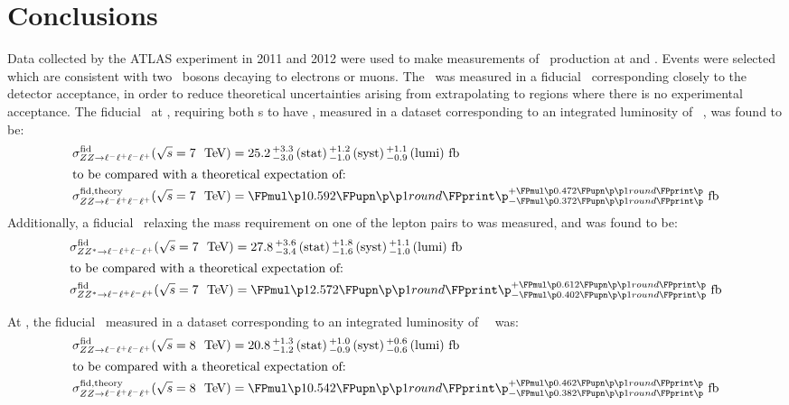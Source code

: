 \graphicspath{{Chapters/Conclusions/Figures/}}
\chapter{Conclusions}
\label{chap:Conclusions}
Data collected by the ATLAS experiment in 2011 and 2012 were used to make
measurements of \ZZ\ production at  and .
Events were selected which are consistent with two \Z\ bosons decaying to
electrons or muons. The \cx\ was measured in a fiducial \phasespace\
corresponding closely to the detector acceptance, in order to reduce theoretical
uncertainties arising from extrapolating to regions where there is no
experimental acceptance.
The fiducial \cx\ at \sqrtseq{7}, requiring both \leppair s to have \sstooos, measured in a
dataset corresponding to an integrated luminosity of
\LumiPassGRLTwentyEleven~\ifb, was found to be:
\begin{align}
\sigmaFidZZllll(\sqrtseq{7}) &= \ZZSevenTeVFiducialCrossSectionZZLLLL \\
\intertext{to be compared with a theoretical expectation of:}
\sigmaFidTheoryZZllll(\sqrtseq{7}) &= \ZZSevenTeVTheoryFiducialCrossSectionZZLLLL
\end{align}
Additionally, a fiducial \cx\ relaxing the mass requirement on one of the lepton pairs
to \mllgtt was measured, and was found to be:
\begin{align}
\sigmaFidZZsllll(\sqrtseq{7}) &= \ZZSevenTeVFiducialCrossSectionZZsLLLL \\
\intertext{to be compared with a theoretical expectation of:}
\sigmaFidZZsllll(\sqrtseq{7}) &= \ZZSevenTeVTheoryFiducialCrossSectionZZsLLLL
\end{align}

At , the fiducial \cx\ measured in a dataset corresponding to an integrated luminosity of
\LumiPassGRLTwentyTwelve~\ifb\ was:
\begin{align}
\sigmaFidZZllll(\sqrtseq{8}) &= \ZZEightTeVFiducialCrossSectionZZLLLL \\
\intertext{to be compared with a theoretical expectation of:}
\sigmaFidTheoryZZllll(\sqrtseq{8}) &= \ZZEightTeVTheoryFiducialCrossSectionZZLLLL
\end{align}

